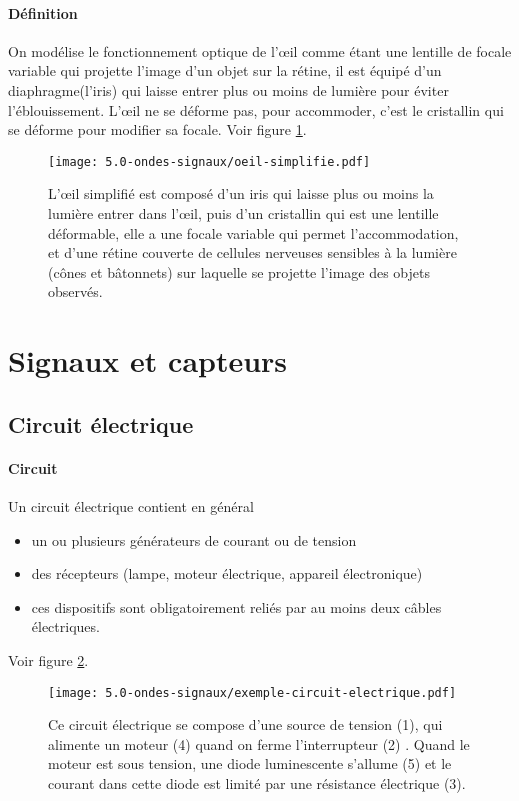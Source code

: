 \paragraph{Définition} On modélise le fonctionnement optique de l’œil comme étant une lentille de focale variable qui projette l'image d'un objet sur la rétine, il est équipé d'un diaphragme(l'iris) qui laisse entrer plus ou moins de lumière pour éviter l'éblouissement. L’œil ne se déforme pas, pour accommoder, c'est le cristallin qui se déforme pour modifier sa focale. Voir figure \ref{fig:oeil-simplifie}.
\begin{figure}[h!]
  \begin{center}
      \texttt{[image: 5.0-ondes-signaux/oeil-simplifie.pdf]}
  \end{center}
  \caption{L’œil simplifié est composé d'un iris qui laisse plus ou moins la lumière entrer dans l’œil, puis d'un cristallin qui est une lentille déformable, elle a une focale variable qui permet l’accommodation, et d'une rétine couverte de cellules nerveuses sensibles à la lumière (cônes et bâtonnets) sur laquelle se projette l'image des objets observés. }
  \label{fig:oeil-simplifie}
\end{figure}



\section{Signaux et capteurs}
\subsection{Circuit électrique}
\paragraph{Circuit} Un circuit électrique contient en général
\begin{itemize}
 \item un ou plusieurs générateurs de courant ou de tension
 \item des récepteurs (lampe, moteur électrique, appareil électronique)
 \item ces dispositifs sont obligatoirement reliés par au moins deux câbles électriques.
\end{itemize}
Voir figure \ref{fig:exemple-circuit-electrique}.
\begin{figure}[h!]
  \begin{center}
      \texttt{[image: 5.0-ondes-signaux/exemple-circuit-electrique.pdf]}
  \end{center}
  \caption{Ce circuit électrique se compose d'une source de tension (1), qui alimente un moteur (4) quand on ferme l'interrupteur (2) . Quand le moteur est sous tension, une diode luminescente s'allume (5) et le courant dans cette diode est limité par une résistance électrique (3). }
  \label{fig:exemple-circuit-electrique}
\end{figure}


